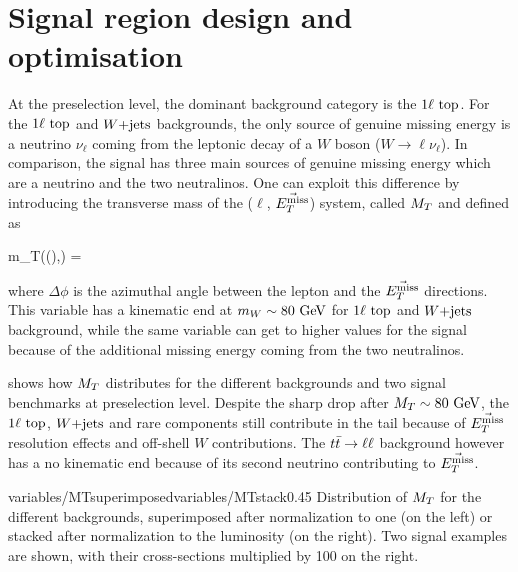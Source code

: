    \section{Signal region design and optimisation \label{sec:analysis_optimization}}

    At the preselection level, the dominant background category is the $1\ell~\text{top}$.
    For the $1\ell~\text{top}$ and $\text{$W$+jets}$ backgrounds, the only source of genuine missing
    energy is a neutrino $\nu_\ell$ coming from the leptonic decay of a $W$ boson ($W
    \rightarrow \ell \nu_{\ell}$). In comparison, the signal has three main sources of
    genuine missing energy which are a neutrino and the two neutralinos.
    One can exploit this difference by introducing the transverse mass of the ($\ell$,
    $\vec{E_T^\text{miss}}$) system, called $M_T$ and defined as

    {
        \MT
        m_T((\ell),\vec{\MET})
        =
    }

    where $\Delta \phi$ is the azimuthal angle between the lepton and the $\vec{E_T^\text{miss}}$
    directions. This variable has a kinematic end at $m_{W} \sim 80~\text{GeV}$ for $1\ell~\text{top}$
    and $\text{$W$+jets}$ background, while the same variable can get to higher values for the signal
    because of the additional missing energy coming from the two neutralinos.

     shows how $M_T$ distributes for the different
    backgrounds and two signal benchmarks at preselection level. Despite the sharp drop after
    $M_T \sim 80~\text{GeV}$, the $1\ell~\text{top}$, $\text{$W$+jets}$ and rare components still contribute
    in the tail because of $\vec{E_T^\text{miss}}$ resolution effects and off-shell $W$ contributions.
    The $t\bar{t} \rightarrow \ell \ell$ background however has a no kinematic end because of its second
    neutrino contributing to $\vec{E_T^\text{miss}}$.

                     {variables/MTsuperimposed}{variables/MTstack}{0.45}
                     {Distribution of $M_T$ for the different backgrounds,
                     superimposed after normalization to one (on the left) or
                     stacked after normalization to the luminosity (on the right).
                     Two signal examples are shown, with their cross-sections multiplied
                     by 100 on the right.}

